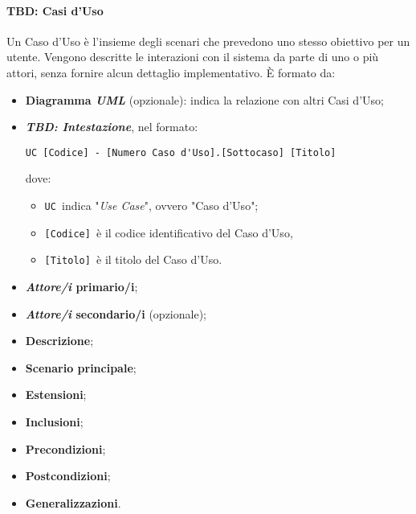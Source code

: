 \documentclass[a4paper, 12pt]{article}
\begin{document}
\paragraph{TBD: Casi d'Uso}
Un Caso d'Uso è l'insieme degli scenari che prevedono uno stesso obiettivo per
un utente. Vengono descritte le interazioni con il sistema da parte di uno o più
attori, senza fornire alcun dettaglio implementativo. È formato da:
\begin{itemize}
    \item \textbf{Diagramma \textit{UML}} (opzionale): indica la relazione con
    altri Casi d'Uso;
    \item \textit{\textbf{TBD: Intestazione}}, nel formato:
    \begin{center}
        \begin{BVerbatim}
UC [Codice] - [Numero Caso d'Uso].[Sottocaso] [Titolo]
        \end{BVerbatim}   
    \end{center}
    dove:
    \begin{itemize}
        \item \Verb^UC ^indica "\textit{Use Case}", ovvero "Caso d'Uso";
        \item \Verb^[Codice] ^è il codice identificativo del Caso d'Uso, 
        \item \Verb^[Titolo] ^è il titolo del Caso d'Uso. 
    \end{itemize}
    \item \textbf{\textit{Attore/i} primario/i};
    \item \textbf{\textit{Attore/i} secondario/i} (opzionale);
    \item \textbf{Descrizione};
    \item \textbf{Scenario principale};
    \item \textbf{Estensioni};
    \item \textbf{Inclusioni};
    \item \textbf{Precondizioni};
    \item \textbf{Postcondizioni};
    \item \textbf{Generalizzazioni}.
\end{itemize}
\end{document}

